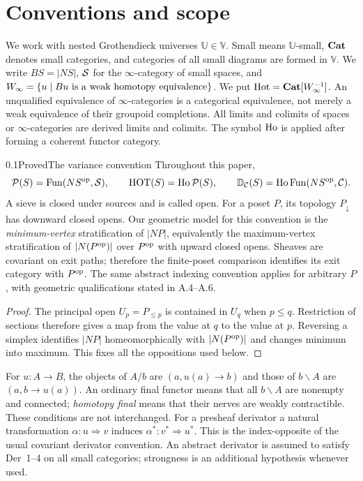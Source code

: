 \section*{Conventions and scope}

We work with nested Grothendieck universes $\mathbb U\in\mathbb V$.
Small means $\mathbb U$-small, $\mathbf{Cat}$ denotes small categories, and
categories of all small diagrams are formed in $\mathbb V$.
We write $BS=|NS|$, $\mathcal S$ for the $\infty$-category of
small spaces, and $W_{\infty}=\{u\mid Bu\text{ is a weak homotopy equivalence}\}$.
We put $\mathrm{Hot}=\mathbf{Cat}[W_{\infty}^{-1}]$.
An unqualified equivalence of $\infty$-categories is a categorical equivalence,
not merely a weak equivalence of their groupoid completions. All limits and
colimits of spaces or $\infty$-categories are derived limits and colimits.
The symbol $\operatorname{Ho}$ is applied after forming a coherent functor category.

\begin{statement}{0.1}{Proved}{The variance convention}
Throughout this paper,
\[
 \mathcal P(S)=\operatorname{Fun}(NS^{\mathrm{op}},\mathcal S),\qquad
 \mathrm{HOT}(S)=\operatorname{Ho}\mathcal P(S),\qquad
 \mathbb D_{\mathcal C}(S)=\operatorname{Ho}\operatorname{Fun}(NS^{\mathrm{op}},\mathcal C).
\]
A sieve is closed under sources and is called open. For a poset $P$, its
topology $P_{\downarrow}$ has downward closed opens. Our geometric model
for this convention is the \emph{minimum-vertex} stratification of $|NP|$,
equivalently the maximum-vertex stratification of $|N(P^{\mathrm{op}})|$ over
$P^{\mathrm{op}}$ with upward closed opens. Sheaves are covariant on exit paths;
therefore the finite-poset comparison identifies its exit category with
$P^{\mathrm{op}}$. The same abstract indexing convention applies for arbitrary
$P$, with geometric qualifications stated in A.4--A.6.
\end{statement}
\begin{proof}
The principal open $U_p=P_{\leq p}$ is contained in $U_q$ when $p\leq q$.
Restriction of sections therefore gives a map from the value at $q$ to the
value at $p$. Reversing a simplex identifies $|NP|$ homeomorphically with
$|N(P^{\mathrm{op}})|$ and changes minimum into maximum. This fixes all the
oppositions used below.
\end{proof}

For $u:A\to B$, the objects of $A/b$ are $(a,u(a)\to b)$ and those of
$b\backslash A$ are $(a,b\to u(a))$. An ordinary final functor means that
all $b\backslash A$ are nonempty and connected; \emph{homotopy final}
means that their nerves are weakly contractible. These conditions are not
interchanged. For a presheaf derivator a natural transformation
$\alpha:u\Rightarrow v$ induces $\alpha^*:v^*\Rightarrow u^*$.
This is the index-opposite of the usual covariant derivator convention.
An abstract derivator is assumed to satisfy Der~1--4 on all small
categories; strongness is an additional hypothesis whenever used.

